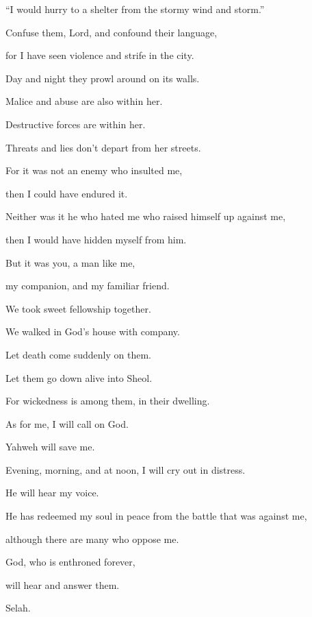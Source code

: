 {\Q {}“I would hurry to a shelter from the stormy wind and storm.”
\par }{\Q {}Confuse them, Lord, and confound their language,
\par }{\QB for I have seen violence and strife in the city.
\par }{\Q {}Day and night they prowl around on its walls.
\par }{\QB Malice and abuse are also within her.
\par }{\Q {}Destructive forces are within her.
\par }{\QB Threats and lies don’t depart from her streets.
\par }{\Q {}For it was not an enemy who insulted me,
\par }{\QB then I could have endured it.
\par }{\Q Neither was it he who hated me who raised himself up against me,
\par }{\QB then I would have hidden myself from him.
\par }{\Q {}But it was you, a man like me,
\par }{\QB my companion, and my familiar friend.
\par }{\Q {}We took sweet fellowship together.
\par }{\QB We walked in God’s house with company.
\par }{\Q {}Let death come suddenly on them.
\par }{\QB Let them go down alive into Sheol.
\par }{\QB For wickedness is among them, in their dwelling.
\par }{\Q {}As for me, I will call on God.
\par }{\QB Yahweh will save me.
\par }{\Q {}Evening, morning, and at noon, I will cry out in distress.
\par }{\QB He will hear my voice.
\par }{\Q {}He has redeemed my soul in peace from the battle that was against me,
\par }{\QB although there are many who oppose me.
\par }{\Q {}God, who is enthroned forever,
\par }{\QB will hear and answer them.
\par }{\QS Selah.\par }
